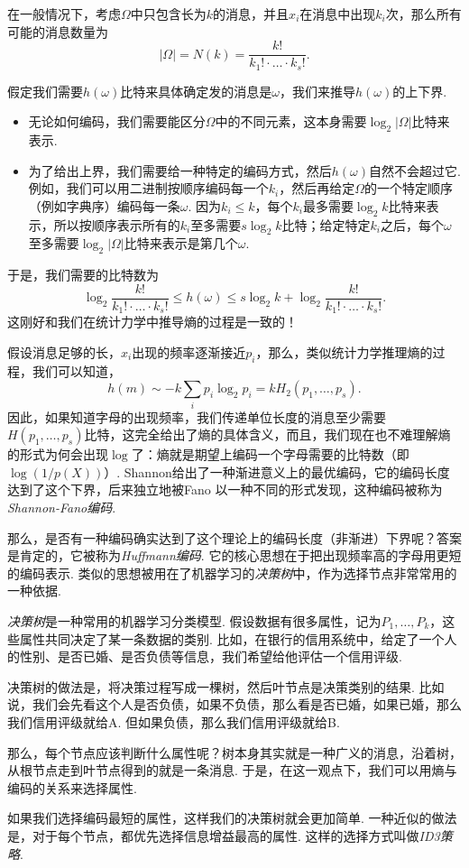 在一般情况下，考虑$\Omega$中只包含长为$k$的消息，并且$x_i$在消息中出现$k_i$次，那么所有可能的消息数量为
\[|\Omega|=N(k)=\frac{k!}{k_1!\cdot\dots\cdot k_s!}.\]

假定我们需要$h(\omega)$比特来具体确定发的消息是$\omega$，我们来推导$h(\omega)$的上下界. 
\begin{itemize}
    \item 无论如何编码，我们需要能区分$\Omega$中的不同元素，这本身需要$\log_2|\Omega|$比特来表示. 
    \item 为了给出上界，我们需要给一种特定的编码方式，然后$h(\omega)$自然不会超过它. 例如，我们可以用二进制按顺序编码每一个$k_i$，然后再给定$\Omega$的一个特定顺序（例如字典序）编码每一条$\omega$. 因为$k_i\leq k$，每个$k_i$最多需要$\log_2 k$比特来表示，所以按顺序表示所有的$k_i$至多需要$s\log_2 k$比特；给定特定$k_i$之后，每个$\omega$至多需要$\log_2|\Omega|$比特来表示是第几个$\omega$. 
\end{itemize}
于是，我们需要的比特数为
\[\log_2\frac{k!}{k_1!\cdot\dots\cdot k_s!}\leq h(\omega)\leq s\log_2k+\log_2\frac{k!}{k_1!\cdot\dots\cdot k_s!}.\]
这刚好和我们在统计力学中推导熵的过程是一致的！

假设消息足够的长，$x_i$出现的频率逐渐接近$p_i$，那么，类似统计力学推理熵的过程，我们可以知道，
\[h(m)\sim -k\sum_i p_i\log_2 p_i=kH_2(p_1,\dots,p_s).\]
因此，如果知道字母的出现频率，我们传递单位长度的消息至少需要$H(p_1,\dots,p_s)$比特，这完全给出了熵的具体含义，而且，我们现在也不难理解熵的形式为何会出现$\log$了：熵就是期望上编码一个字母需要的比特数（即$\log(1/p(X))$）. Shannon给出了一种渐进意义上的最优编码，它的编码长度达到了这个下界，后来独立地被Fano \cite{robertm.fanoTransmissionInformation1949} 以一种不同的形式发现，这种编码被称为\textit{Shannon-Fano编码}.

那么，是否有一种编码确实达到了这个理论上的编码长度（非渐进）下界呢？答案是肯定的，它被称为\textit{Huffmann编码}. 它的核心思想在于把出现频率高的字母用更短的编码表示. 类似的思想被用在了机器学习的\textit{决策树}中，作为选择节点非常常用的一种依据.
\begin{remark}
    \textit{决策树}是一种常用的机器学习分类模型. 假设数据有很多属性，记为$P_1,\dots,P_k$，这些属性共同决定了某一条数据的类别. 比如，在银行的信用系统中，给定了一个人的性别、是否已婚、是否负债等信息，我们希望给他评估一个信用评级. 
    
    决策树的做法是，将决策过程写成一棵树，然后叶节点是决策类别的结果. 比如说，我们会先看这个人是否负债，如果不负债，那么看是否已婚，如果已婚，那么我们信用评级就给A. 但如果负债，那么我们信用评级就给B. 
    
    那么，每个节点应该判断什么属性呢？树本身其实就是一种广义的消息，沿着树，从根节点走到叶节点得到的就是一条消息. 于是，在这一观点下，我们可以用熵与编码的关系来选择属性. 

    如果我们选择编码最短的属性，这样我们的决策树就会更加简单. 一种近似的做法是，对于每个节点，都优先选择信息增益最高的属性. 这样的选择方式叫做\textit{ID3策略}.
\end{remark}

